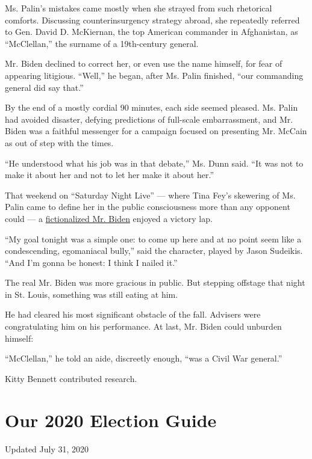 Ms. Palin's mistakes came mostly when she strayed from such rhetorical
comforts. Discussing counterinsurgency strategy abroad, she repeatedly
referred to Gen. David D. McKiernan, the top American commander in
Afghanistan, as ``McClellan,'' the surname of a 19th-century general.

Mr. Biden declined to correct her, or even use the name himself, for
fear of appearing litigious. ``Well,'' he began, after Ms. Palin
finished, ``our commanding general did say that.''

By the end of a mostly cordial 90 minutes, each side seemed pleased. Ms.
Palin had avoided disaster, defying predictions of full-scale
embarrassment, and Mr. Biden was a faithful messenger for a campaign
focused on presenting Mr. McCain as out of step with the times.

``He understood what his job was in that debate,'' Ms. Dunn said. ``It
was not to make it about her and not to let her make it about her.''

That weekend on ``Saturday Night Live'' --- where Tina Fey's skewering
of Ms. Palin came to define her in the public consciousness more than
any opponent could --- a
\href{https://www.nbc.com/saturday-night-live/video/vp-debate-open-palin--biden/n12319}{fictionalized
Mr. Biden} enjoyed a victory lap.

``My goal tonight was a simple one: to come up here and at no point seem
like a condescending, egomaniacal bully,'' said the character, played by
Jason Sudeikis. ``And I'm gonna be honest: I think I nailed it.''

The real Mr. Biden was more gracious in public. But stepping offstage
that night in St. Louis, something was still eating at him.

He had cleared his most significant obstacle of the fall. Advisers were
congratulating him on his performance. At last, Mr. Biden could unburden
himself:

``McClellan,'' he told an aide, discreetly enough, ``was a Civil War
general.''

Kitty Bennett contributed research.

\hypertarget{our-2020-election-guide}{%
\section{Our 2020 Election Guide}\label{our-2020-election-guide}}

Updated July 31, 2020

